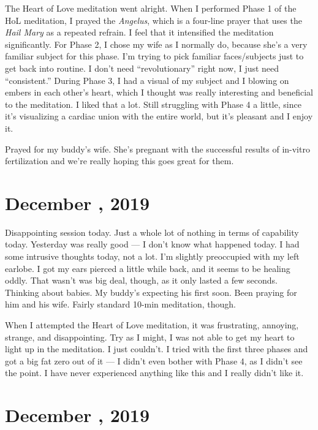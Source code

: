 \documentclass[b6paper]{article}
\begin{document}
The Heart of Love meditation went alright. When I performed Phase 1 of the HoL meditation, I prayed the \textit{Angelus}, which is a four-line prayer that uses the \textit{Hail Mary} as a repeated refrain. I feel that it intensified the meditation significantly. For Phase 2, I chose my wife as I normally do, because she's a very familiar subject for this phase. I'm trying to pick familiar faces/subjects just to get back into routine. I don't need ``revolutionary'' right now, I just need ``consistent.'' During Phase 3, I had a visual of my subject and I blowing on embers in each other's heart, which I thought was really interesting and beneficial to the meditation. I liked that a lot. Still struggling with Phase 4 a little, since it's visualizing a cardiac union with the entire world, but it's pleasant and I enjoy it.

Prayed for my buddy's wife. She's pregnant with the successful results of in-vitro fertilization and we're really hoping this goes great for them.
 

\pagebreak

\section*{December , 2019}

Disappointing session today. Just a whole lot of nothing in terms of capability today. Yesterday was really good --- I don't know what happened today. I had some intrusive thoughts today, not a lot. I'm slightly preoccupied with my left earlobe. I got my ears pierced a little while back, and it seems to be healing oddly. That wasn't was big deal, though, as it only lasted a few seconds. Thinking about babies. My buddy's expecting his first soon. Been praying for him and his wife. Fairly standard 10-min meditation, though.

When I attempted the Heart of Love meditation, it was frustrating, annoying, strange, and disappointing. Try as I might, I was not able to get my heart to light up in the meditation. I just couldn't. I tried with the first three phases and got a big fat zero out of it --- I didn't even bother with Phase 4, as I didn't see the point. I have never experienced anything like this and I really didn't like it.

\pagebreak
\section*{December , 2019}
\end{document}
